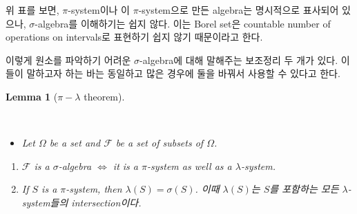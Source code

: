 \documentclass[
  letterpaper,
  DIV=11,
  numbers=noendperiod]{scrreprt}
\providecommand{\tightlist}{%
  \setlength{\itemsep}{0pt}\setlength{\parskip}{0pt}}
\theoremstyle{definition}
\theoremstyle{plain}
\theoremstyle{plain}
\theoremstyle{definition}
\theoremstyle{plain}
\newtheorem{lemma}{Lemma}[chapter]
\theoremstyle{definition}
\theoremstyle{remark}
\begin{document}
위 표를 보면, \(\pi\)-system이나 이 \(\pi\)-system으로 만든 algebra는
명시적으로 표사되어 있으나, \(\sigma\)-algebra를 이해하기는 쉽지 않다.
이는 Borel set은 countable number of operations on intervals로 표현하기
쉽지 않기 때문이라고 한다.

이렇게 원소를 파악하기 어려운 \(\sigma\)-algebra에 대해 말해주는
보조정리 두 개가 있다. 이들이 말하고자 하는 바는 동일하고 많은 경우에
둘을 바꿔서 사용할 수 있다고 한다.

\begin{lemma}[\(\pi-\lambda\)
theorem]\protect\hypertarget{lem-pilambdathm}{}\label{lem-pilambdathm}

~

\begin{itemize}
\tightlist
\item
  Let \(\Omega\) be a set and \(\mathcal{F}\) be a set of subsets of
  \(\Omega\).
\end{itemize}

\begin{enumerate}
\def\labelenumi{\arabic{enumi}.}
\item
  \(\mathcal{F}\) is a \(\sigma\)-algebra \(\Longleftrightarrow\) it is
  a \(\pi\)-system as well as a \(\lambda\)-system.
\item
  If \(S\) is a \(\pi\)-system, then \(\lambda (S) = \sigma(S)\). 이때
  \(\lambda (S)\)는 \(S\)를 포함하는 모든 \(\lambda\)-system들의
  intersection이다.
\end{enumerate}

\end{lemma}
\end{document}
